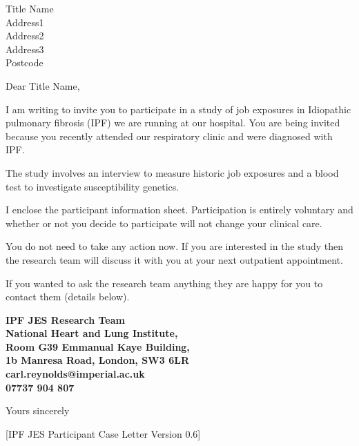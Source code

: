 \documentclass[ipfjes-centre,letterpaper,pagesize,UScommercial9]{scrlttr2}
\begin{document}
\begin{letter}{Title Name \\ Address1 \\ Address2 \\ Address3 \\ Postcode}


\opening{Dear Title Name,}

     I am writing to invite you to participate in a study of job exposures in Idiopathic pulmonary fibrosis (IPF) we are running at our hospital. You are being invited because you recently attended our respiratory clinic and were diagnosed with IPF. 
     
     The study involves an interview to measure historic job exposures and a blood test to investigate susceptibility genetics. 
     
    I enclose the participant information sheet. Participation is entirely voluntary and whether or not you decide to participate will not change your clinical care. 
    
    You do not need to take any action now. If you are interested in the study then the research team will discuss it with you at your next outpatient appointment.

    If you wanted to ask the research team anything they are happy for you to contact them (details below).

    \vspace{1cm}
    \begin{centering}
    \textbf{
    IPF JES Research Team \\  
    National Heart and Lung Institute, \\
    Room G39 Emmanual Kaye Building, \\
    1b Manresa Road, London, SW3 6LR\\
    carl.reynolds@imperial.ac.uk \\
    07737 904 807 \\
    }
    \end{centering}
    \vspace{1cm}

\closing{Yours sincerely}

     \vfill \hfill [IPF JES Participant Case Letter Version 0.6]


\end{letter}
\end{document}
